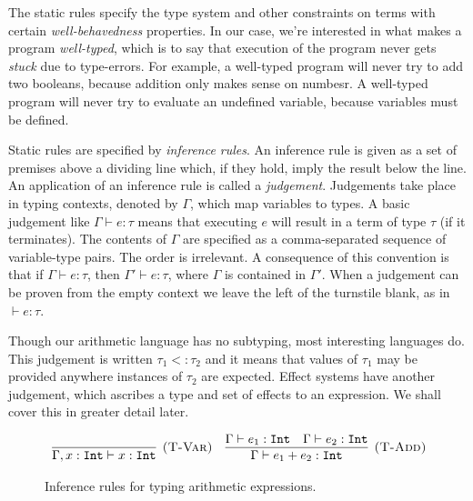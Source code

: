 The static rules specify the type system and other constraints on terms with certain \textit{well-behavedness} properties. In our case, we're interested in what makes a program \textit{well-typed}, which is to say that execution of the program never gets \textit{stuck} due to type-errors. For example, a well-typed program will never try to add two booleans, because addition only makes sense on numbesr. A well-typed program will never try to evaluate an undefined variable, because variables must be defined.

Static rules are specified by \textit{inference rules}. An inference rule is given as a set of premises above a dividing line which, if they hold, imply the result below the line. An application of an inference rule is called a \textit{judgement}. Judgements take place in typing contexts, denoted by $\Gamma$, which map variables to types. A basic judgement like $\Gamma \vdash e: \tau$ means that executing $e$ will result in a term of type $\tau$ (if it terminates). The contents of $\Gamma$ are specified as a comma-separated sequence of variable-type pairs. The order is irrelevant. A consequence of this convention is that if $\Gamma \vdash e: \tau$, then $\Gamma' \vdash e: \tau$, where $\Gamma$ is contained in $\Gamma'$. When a judgement can be proven from the empty context we leave the left of the turnstile blank, as in $\vdash e: \tau$.

Though our arithmetic language has no subtyping, most interesting languages do. This judgement is written $\tau_1 <: \tau_2$ and it means that values of $\tau_1$ may be provided anywhere instances of $\tau_2$ are expected. Effect systems have another judgement, which ascribes a type and set of effects to an expression. We shall cover this in greater detail later.

\begin{figure}[h]

\noindent
{}

\[
\begin{array}{c}

\infer[\textsc{(T-Var)}]
	{\Gamma, x: \kwa{Int} \vdash x: \kwa{Int}}
	{}
~~~
\infer[\textsc{(T-Add)}]
	{\Gamma \vdash e_1 + e_2 : \kwa{Int}}
	{\Gamma \vdash e_1: \kwa{Int} & \Gamma \vdash e_2: \kwa{Int}}
	
\end{array}
\]

\vspace{-7pt}
\caption{Inference rules for typing arithmetic expressions.}
\label{A sample. }
\end{figure}

